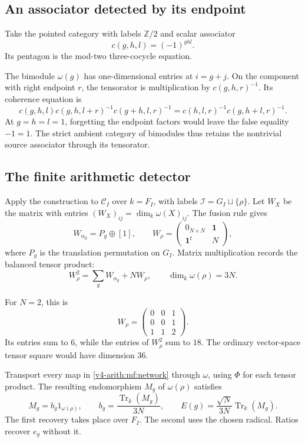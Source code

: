 \subsection{An associator detected by its endpoint}

Take the pointed category with labels \(\mathbb Z/2\)
and scalar associator
\[
 c(g,h,l)=(-1)^{ghl}.
\]
Its pentagon is the mod-two three-cocycle equation.

The bimodule \(\omega(g)\) has one-dimensional entries at
\(i=g+j\). On the component with right endpoint \(r\),
the tensorator is multiplication by \(c(g,h,r)^{-1}\).
Its coherence equation is
\[
 c(g,h,l)c(g,h,l+r)^{-1}c(g+h,l,r)^{-1}
       =c(h,l,r)^{-1}c(g,h+l,r)^{-1}.
\]
At \(g=h=l=1\), forgetting the endpoint factors would leave
the false equality \(-1=1\).
The strict ambient category of bimodules thus retains the
nontrivial source associator through its tensorator.

\subsection{The finite arithmetic detector}

Apply the construction to \(\mathcal C_I\) over \(k=F_I\),
with labels \(\mathcal I=G_I\sqcup\{\rho\}\).
Let \(W_X\) be the matrix with entries
\((W_X)_{ij}=\dim_k\omega(X)_{ij}\).
The fusion rule gives
\begin{equation}\label{v4-arith:mf:multiplicities}
 W_{\alpha_g}=P_g\oplus[1],\qquad
 W_\rho=
 \begin{pmatrix}
  0_{N\times N}&\mathbf1\\
  \mathbf1^t&N
 \end{pmatrix},
\end{equation}
where \(P_g\) is the translation permutation on \(G_I\).
Matrix multiplication records the balanced tensor product:
\[
 W_\rho^2=\sum_gW_{\alpha_g}+NW_\rho,\qquad
 \dim_k\omega(\rho)=3N.
\]

For \(N=2\), this is
\[
 W_\rho=\begin{pmatrix}0&0&1\\0&0&1\\1&1&2\end{pmatrix}.
\]
Its entries sum to \(6\), while the entries of \(W_\rho^2\)
sum to \(18\).
The ordinary vector-space tensor square would have dimension \(36\).

Transport every map in \eqref{v4-arith:mf:network}
through \(\omega\), using \(\Phi\) for each tensor product.
The resulting endomorphism \(M_g\) of \(\omega(\rho)\) satisfies
\begin{equation}\label{v4-arith:mf:matrix-detector}
 M_g=b_g1_{\omega(\rho)},\qquad
 b_g=\frac{\operatorname{Tr}_k(M_g)}{3N},\qquad
 E(g)=\frac{\sqrt N}{3N}\operatorname{Tr}_k(M_g).
\end{equation}
The first recovery takes place over \(F_I\).
The second uses the chosen radical. Ratios recover \(e_g\)
without it.

